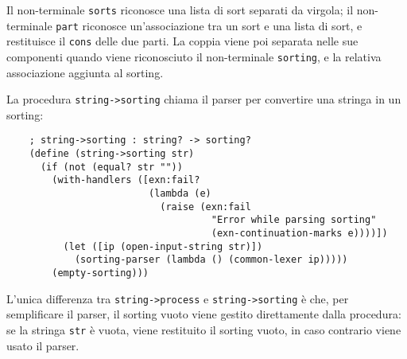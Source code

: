 Il non-terminale \lstinline{sorts} riconosce una lista di sort separati
da virgola; il non-terminale \lstinline{part} riconosce un'associazione
tra un sort e una lista di sort, e restituisce il \lstinline{cons} delle
due parti. La coppia viene poi separata nelle sue componenti quando
viene riconosciuto il non-terminale \lstinline{sorting}, e la relativa
associazione aggiunta al sorting.

La procedura \lstinline{string->sorting} chiama il parser per convertire
una stringa in un sorting:

\begin{lstlisting}
    ; string->sorting : string? -> sorting?
    (define (string->sorting str)
      (if (not (equal? str ""))
        (with-handlers ([exn:fail?
                         (lambda (e)
                           (raise (exn:fail
                                    "Error while parsing sorting"
                                    (exn-continuation-marks e))))])
          (let ([ip (open-input-string str)])
            (sorting-parser (lambda () (common-lexer ip)))))
        (empty-sorting)))
\end{lstlisting}

L'unica differenza tra \lstinline{string->process} e
\lstinline{string->sorting} \`e che, per semplificare il parser, il
sorting vuoto viene gestito direttamente dalla procedura: se la
stringa \lstinline{str} \`e vuota, viene restituito il sorting vuoto,
in caso contrario viene usato il parser.
